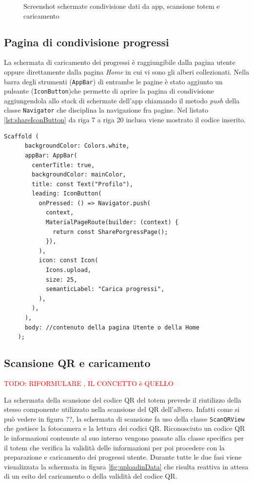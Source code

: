 \begin{figure}[h!]
{        \label{fig:uploadinData}
    } 
    \caption{Screenshot schermate condivisione dati da app, scansione totem e caricamento}
    \label{fig:shareDataApp}
\end{figure}

\subsection{Pagina di condivisione progressi}
La schermata di caricamento dei progressi è raggiungibile dalla pagina utente oppure direttamente dalla pagina \textit{Home} in cui vi sono gli alberi collezionati. Nella barra degli strumenti (\texttt{AppBar}) di entrambe le pagine è stato aggiunto un pulsante (\texttt{IconButton})che permette di aprire la pagina di condivisione aggiungendola allo stack di schermate dell'app chiamando il metodo \textit{push} della classe \texttt{Navigator} che disciplina la navigazione fra pagine. Nel listato \ref{lst:shareIconButton} da riga 7 a riga 20 inclusa viene mostrato il codice inserito.

\begin{lstlisting}[style=FlutterStyle, caption={Codice aggiornato della barra degli strumenti dell'app: inserito pulsante per la condivisione dei progressi.}, label={lst:shareIconButton}]
    Scaffold (
      backgroundColor: Colors.white,
      appBar: AppBar(
        centerTitle: true,
        backgroundColor: mainColor, 
        title: const Text("Profilo"),
        leading: IconButton(
          onPressed: () => Navigator.push(
            context,
            MaterialPageRoute(builder: (context) {
              return const SharePorgressPage();
            }),
          ),
          icon: const Icon(
            Icons.upload,
            size: 25,
            semanticLabel: "Carica progressi",
          ),
        ),
      ),
      body: //contenuto della pagina Utente o della Home
    );
\end{lstlisting}

\subsection{Scansione QR e caricamento}
\textcolor{red}{TODO: RIFORMULARE , IL CONCETTO è QUELLO}

La schermata della scansione del codice QR del totem prevede il riutilizzo della stesso componente utilizzato nella scansione del QR dell'albero. Infatti come si può vedere in figura ??, la schermata di scansione fa uso della classe \texttt{ScanQRView} che gestisce la fotocamera e la lettura dei codici QR. Riconosciuto un codice QR le informazioni contenute al suo interno vengono passate alla classe specifica per il totem che verifica la validità delle informazioni per poi procedere con la preparazione e caricamento dei progressi utente. Durante tutte le due fasi viene visualizzata la schermata in figura \ref{fig:uploadinData} che risulta reattiva in attesa di un esito del caricamento o della validità del codice QR.

